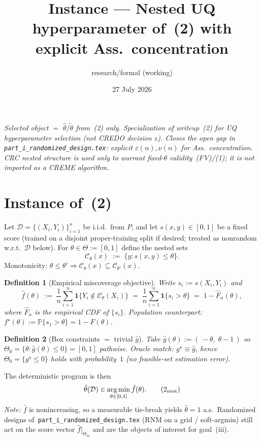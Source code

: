 \documentclass[11pt]{article}
\title{Instance --- Nested UQ hyperparameter of~(2) with explicit Ass.\ concentration}
\author{research/formal (working)}
\date{27 July 2026}
\newtheorem{definition}{Definition}
\begin{document}
\maketitle

\noindent\textit{Selected object $=$ $\hat\theta/\tilde\theta$ from~(2) only.
Specialization of writeup~(2) for UQ hyperparameter selection (not CREDO decision $z$).
Closes the open gap in \texttt{part\_i\_randomized\_design.tex}: explicit $\varepsilon(n),\nu(n)$ for Ass.\ concentration.
CRC nested structure is used only to warrant fixed-$\theta$ validity~(FV)/(1); it is not imported as a CREME algorithm.}

\section{Instance of~(2)}

Let $\mathcal{D}=\{(X_i,Y_i)\}_{i=1}^n$ be i.i.d.\ from $P$, and let $s(x,y)\in[0,1]$ be a fixed score
(trained on a disjoint proper-training split if desired; treated as nonrandom w.r.t.\ $\mathcal{D}$ below).
For $\theta\in\Theta:=[0,1]$ define the nested sets
\begin{equation}
\label{eq:Ctheta}
\mathcal{C}_\theta(x)
\;:=\;
\{y:s(x,y)\le\theta\}.
\end{equation}
Monotonicity: $\theta\le\theta'\Rightarrow\mathcal{C}_\theta(x)\subseteq\mathcal{C}_{\theta'}(x)$.

\begin{definition}[Empirical miscoverage objective]
\label{def:fhat}
Write $s_i:=s(X_i,Y_i)$ and
\[
\hat f(\theta)
\;:=\;
\frac1n\sum_{i=1}^n \mathbf{1}\{Y_i\notin\mathcal{C}_\theta(X_i)\}
\;=\;
\frac1n\sum_{i=1}^n \mathbf{1}\{s_i>\theta\}
\;=\;
1-\widehat F_n(\theta),
\]
where $\widehat F_n$ is the empirical CDF of $\{s_i\}$. Population counterpart:
$f^\star(\theta):=\mathbb{P}\{s_1>\theta\}=1-F(\theta)$.
\end{definition}

\begin{definition}[Box constraints $=$ trivial $\hat g$]
\label{def:ghat}
Take $\hat g(\theta):=(\,-\theta,\;\theta-1\,)$ so
$\Theta_0=\{\theta:\hat g(\theta)\le 0\}=[0,1]$ pathwise.
Oracle match: $g^\star\equiv\hat g$, hence $\Theta_0=\{g^\star\le 0\}$ holds with probability~$1$
(no feasible-set estimation error).
\end{definition}

The deterministic program is then
\begin{equation}
\hat\theta(\mathcal{D})
\in
\operatorname*{arg\,min}_{\theta\in[0,1]}
\hat f(\theta).
\tag{2$_{\mathrm{nest}}$}
\end{equation}
\textit{Note:} $\hat f$ is nonincreasing, so a measurable tie-break yields $\hat\theta=1$ a.s.\
Randomized designs of~\texttt{part\_i\_randomized\_design.tex} (RNM on a grid / soft-argmin)
still act on the score vector $\hat f|_{ \Theta_m}$ and are the objects of interest for goal~(iii).
\end{document}
